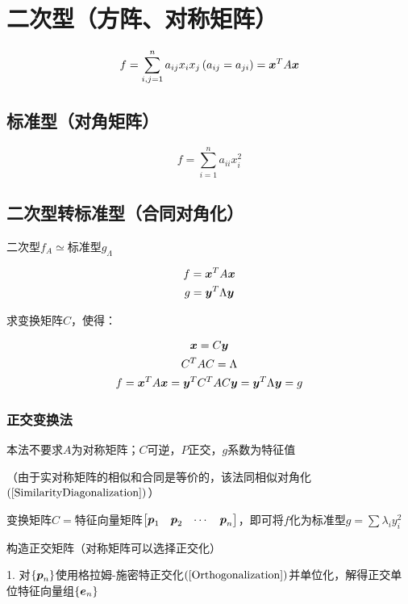 \documentclass{article}
\begin{document}
\section{二次型（方阵、对称矩阵）}

\begin{definition}
    \[f=\sum_{i,j=1}^na_{ij}x_ix_j\left(a_{ij}=a_{ji}\right)
        =\boldsymbol x^TA\boldsymbol x\]
\end{definition}

\subsection{标准型（对角矩阵）}

\[f=\sum_{i=1}^na_{ii}x_i^2\]

\subsection{二次型转标准型（合同对角化）}

二次型$f_A\simeq$标准型$g_\Lambda$

\[\begin{gathered}
        f=\boldsymbol x^TA\boldsymbol x\\
        g=\boldsymbol y^T\Lambda\boldsymbol y
    \end{gathered}\]

求变换矩阵$C$，使得：

\[\begin{gathered}
        \boldsymbol x=C\boldsymbol y\\
        C^TAC=\Lambda\\
        f=\boldsymbol x^TA\boldsymbol x=\boldsymbol y^TC^TAC\boldsymbol y=\boldsymbol y^T\Lambda\boldsymbol y=g
    \end{gathered}\]

\subsubsection{正交变换法}

本法不要求$A$为对称矩阵；$C$可逆，$P$正交，$g$系数为特征值

（由于实对称矩阵的相似和合同是等价的，该法同相似对角化$\left(\ref{SimilarityDiagonalization}\right)$）

变换矩阵$C=$特征向量矩阵$\begin{bmatrix}\boldsymbol p_1&\boldsymbol p_2&\cdots&\boldsymbol p_n\end{bmatrix}$，即可将$f$化为标准型$g=\sum\lambda_iy_i^2$

构造正交矩阵（对称矩阵可以选择正交化）

1. 对$\left\{\boldsymbol p_n\right\}$使用格拉姆-施密特正交化$\left(\ref{Orthogonalization}\right)$并单位化，解得正交单位特征向量组$\left\{\boldsymbol e_n\right\}$
\end{document}
